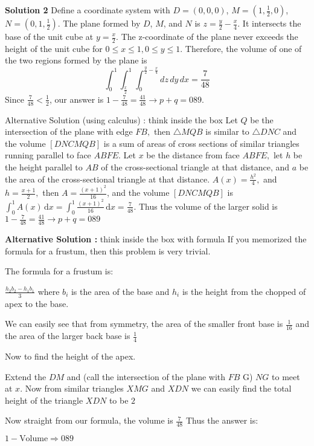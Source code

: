 \documentclass[a4paper,11pt]{article}
\begin{document}
\textbf{Solution 2}
Define a coordinate system with $D = (0,0,0)$, $M = (1, \frac{1}{2}, 0)$, $N = (0,1,\frac{1}{2})$. The plane formed by $D$, $M$, and $N$ is $z = \frac{y}{2} - \frac{x}{4}$. It intersects the base of the unit cube at $y = \frac{x}{2}$. The z-coordinate of the plane never exceeds the height of the unit cube for $0 \leq x \leq 1, 0 \leq y \leq 1$. Therefore, the volume of one of the two regions formed by the plane is \[\int_0^1 \int_{\frac{x}{2}}^1 \int_0^{\frac{y}{2}-\frac{x}{4}}dz\,dy\,dx = \frac{7}{48}\] Since $\frac{7}{48} < \frac{1}{2}$, our answer is $1-\frac{7}{48} = \frac{41}{48} \rightarrow p+q = \boxed{089}$.

Alternative Solution (using calculus) : think inside the box
Let $Q$ be the intersection of the plane with edge $FB,$ then $\triangle MQB$ is similar to $\triangle DNC$ and the volume $[DNCMQB]$ is a sum of areas of cross sections of similar triangles running parallel to face $ABFE.$ Let $x$ be the distance from face $ABFE,$ let $h$ be the height parallel to $AB$ of the cross-sectional triangle at that distance, and $a$ be the area of the cross-sectional triangle at that distance. $A(x)=\frac{h^2}{4},$ and $h=\frac{x+1}{2},$ then $A=\frac{(x+1)^2}{16}$, and the volume $[DNCMQB]$ is $\int^1_0{A(x)}\,\mathrm{d}x=\int^1_0{\frac{(x+1)^2}{16}}\,\mathrm{d}x=\frac{7}{48}.$ Thus the volume of the larger solid is $1-\frac{7}{48}=\frac{41}{48} \rightarrow p+q = \boxed{089}$

\textbf{Alternative Solution :} think inside the box with formula
If you memorized the formula for a frustum, then this problem is very trivial.

The formula for a frustum is:

$\frac{h_2b_2 -h_1b_1}3$ where $b_i$ is the area of the base and $h_i$ is the height from the chopped of apex to the base.

We can easily see that from symmetry, the area of the smaller front base is $\frac{1}{16}$ and the area of the larger back base is $\frac{1}4$

Now to find the height of the apex.

Extend the $DM$ and (call the intersection of the plane with $FB$ G) $NG$ to meet at $x$. Now from similar triangles $XMG$ and $XDN$ we can easily find the total height of the triangle $XDN$ to be $2$

Now straight from our formula, the volume is $\frac{7}{48}$ Thus the answer is:

$1-\text{Volume} \Longrightarrow \boxed{089}$
\end{document}
